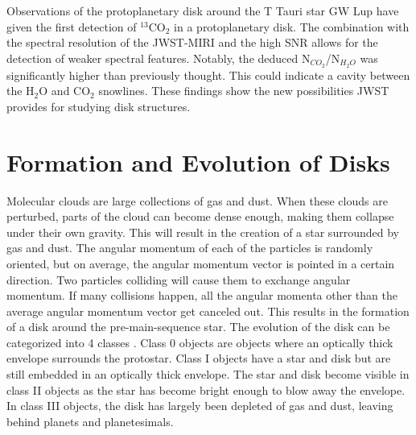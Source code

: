 \documentclass[twoside, single, authoryear, semicolon, 12pt]{lion-msc}
\newcommand{\4}{$_4$}
\newcommand{\3}{$_3$}
\newcommand{\2}{$_2$}
\begin{document}
Observations of the protoplanetary disk around the T Tauri star GW Lup have given the first detection of $^{13}$CO$_2$ in a protoplanetary disk. \cite{Grant_2023} The combination with the spectral resolution of the JWST-MIRI and the high SNR allows for the detection of weaker spectral features. Notably, the deduced N$_{CO_2}$/N$_{H_2O}$ was significantly higher than previously thought. This could indicate a cavity between the H$_2$O and CO$_2$ snowlines. These findings show the new possibilities JWST provides for studying disk structures. 



\section{Formation and Evolution of Disks}
Molecular clouds are large collections of gas and dust. When these clouds are perturbed, parts of the cloud can become dense enough, making them collapse under their own gravity. This will result in the creation of a star surrounded by gas and dust. The angular momentum of each of the particles is randomly oriented, but on average, the angular momentum vector is pointed in a certain direction. Two particles colliding will cause them to exchange angular momentum. If many collisions happen, all the angular momenta other than the average angular momentum vector get canceled out. This results in the formation of a disk around the pre-main-sequence star.
The evolution of the disk can be categorized into 4 classes \citep{1987ApJ...312..788A}. Class 0 objects are objects where an optically thick envelope surrounds the protostar. Class I objects have a star and disk but are still embedded in an optically thick envelope. The star and disk become visible in class II objects as the star has become bright enough to blow away the envelope. In class III objects, the disk has largely been depleted of gas and dust, leaving behind planets and planetesimals. 
\end{document}
